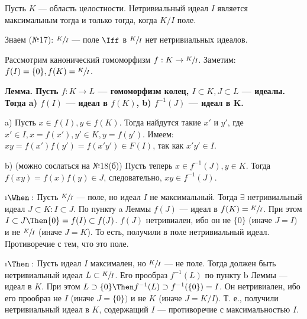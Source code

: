\begin{problem}
Пусть $K$ --- область целостности. Нетривиальный идеал $I$ является максимальным тогда и только тогда, когда $K/I$ поле.
\end{problem}

\begin{solution}
Знаем (№17): \(\sfrac{K}{I}\) --- поле \(\Iff\) в \(\sfrac{K}{I}\) нет нетривиальных идеалов.

Рассмотрим канонический гомоморфизм \(f: K \to \sfrac{K}{I}\). Заметим: $f(I) = \{0\}, f(K) = \sfrac{K}{I}$.

\bf{Лемма.} Пусть \(f: K \to L\) --- гомоморфизм колец, \(I \subset K, J \subset L\) --- идеалы. Тогда a) \(f(I)\) --- идеал в \(f (K)\), b) \(f^{-1} (J)\) --- идеал в K.

\begin{solution}
a) Пусть $x \in f(I), y \in f(K)$. Тогда найдутся такие $x'$ и $y'$, где $x' \in I, x = f(x'), y' \in K, y = f(y')$.
    Имеем: $xy = f(x')f(y') = f (x' y') \in F(I)$, так как $x' y' \in I$.
    
b) (можно сослаться на №18(б)) Пусть теперь $x \in f^{-1}(J), y \in K$. Тогда $f(xy) = f(x)f(y) \in J$, следовательно, $xy \in f^{-1}(J)$.
\end{solution}

\begin{itemize}
\i $\When:$ Пусть $\sfrac{K}{I}$ --- поле, но идеал $I$ не максимальный. Тогда $\exists$ нетривиальный идеал $J \subset K: I \subset J$.
По пункту a Леммы $f(J)$ --- идеал в $f(K) = \sfrac{K}{I}$. При этом $I \subset J \Then \{0\} = f(I) \subset f(J)$. $f(J)$ нетривиален, ибо он не $\{0\}$ (иначе $J=I$) и не $\sfrac{K}{I}$ (иначе $J=K$). То есть, получили в поле нетривиальный идеал. Противоречие с тем, что это поле.

\i $\Then:$ Пусть идеал $I$ максимален, но $\sfrac{K}{I}$ --- не поле. Тогда должен быть нетривиальный идеал $L \subset \sfrac{K}{I}$. Его прообраз $f^{-1}(L)$ по пункту b Леммы --- идеал в $K$. При этом $L \supset \{0\} \Then f^{-1}(L) \supset f^{-1}(\{0\}) = I$. Он нетривиален, ибо его прообраз не $I$ (иначе $J=\{0\})$ и не $K$ (иначе $J = K/I$). Т. е., получили нетривиальный идеал в $K$, содержащий $I$ --- противоречие с максимальностью $I$.
\end{itemize}

\end{solution}

